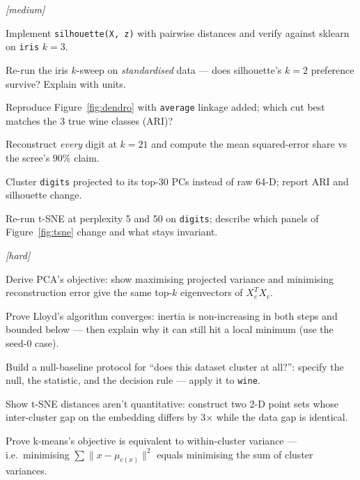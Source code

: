 \emph{[medium]}
\begin{exercise}
Implement \texttt{silhouette(X, z)} with pairwise distances and verify
against sklearn on \texttt{iris} $k{=}3$.
\end{exercise}
\begin{exercise}
Re-run the iris $k$-sweep on \emph{standardised} data --- does
silhouette's $k{=}2$ preference survive? Explain with units.
\end{exercise}
\begin{exercise}
Reproduce Figure~\ref{fig:dendro} with \texttt{average} linkage added;
which cut best matches the 3 true wine classes (ARI)?
\end{exercise}
\begin{exercise}
Reconstruct \emph{every} digit at $k{=}21$ and compute the mean
squared-error share vs the scree's $90\%$ claim.
\end{exercise}
\begin{exercise}
Cluster \texttt{digits} projected to its top-30 PCs instead of raw 64-D;
report ARI and silhouette change.
\end{exercise}
\begin{exercise}
Re-run t-SNE at perplexity 5 and 50 on \texttt{digits}; describe which
panels of Figure~\ref{fig:tsne} change and what stays invariant.
\end{exercise}

\emph{[hard]}
\begin{exercise}
Derive PCA's objective: show maximising projected variance and
minimising reconstruction error give the same top-$k$ eigenvectors of
$X_c^TX_c$.
\end{exercise}
\begin{exercise}
Prove Lloyd's algorithm converges: inertia is non-increasing in both
steps and bounded below --- then explain why it can still hit a local
minimum (use the seed-0 case).
\end{exercise}
\begin{exercise}
Build a null-baseline protocol for ``does this dataset cluster at
all?'': specify the null, the statistic, and the decision rule ---
apply it to \texttt{wine}.
\end{exercise}
\begin{exercise}
Show t-SNE distances aren't quantitative: construct two 2-D point sets
whose inter-cluster gap on the embedding differs by 3$\times$ while the
data gap is identical.
\end{exercise}
\begin{exercise}
Prove k-means's objective is equivalent to within-cluster variance ---
i.e.\ minimising $\sum\|x - \mu_{c(x)}\|^2$ equals minimising the sum of
cluster variances.
\end{exercise}

